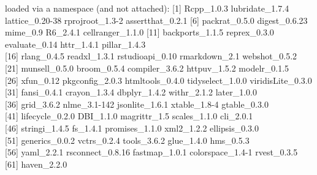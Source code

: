 \documentclass[]{article}
\begin{document}
loaded via a namespace (and not attached): {[}1{]} Rcpp\_1.0.3
lubridate\_1.7.4 lattice\_0.20-38 rprojroot\_1.3-2 assertthat\_0.2.1
{[}6{]} packrat\_0.5.0 digest\_0.6.23 mime\_0.9 R6\_2.4.1
cellranger\_1.1.0 {[}11{]} backports\_1.1.5 reprex\_0.3.0 evaluate\_0.14
httr\_1.4.1 pillar\_1.4.3\\
{[}16{]} rlang\_0.4.5 readxl\_1.3.1 rstudioapi\_0.10 rmarkdown\_2.1
webshot\_0.5.2\\
{[}21{]} munsell\_0.5.0 broom\_0.5.4 compiler\_3.6.2 httpuv\_1.5.2
modelr\_0.1.5\\
{[}26{]} xfun\_0.12 pkgconfig\_2.0.3 htmltools\_0.4.0 tidyselect\_1.0.0
viridisLite\_0.3.0 {[}31{]} fansi\_0.4.1 crayon\_1.3.4 dbplyr\_1.4.2
withr\_2.1.2 later\_1.0.0\\
{[}36{]} grid\_3.6.2 nlme\_3.1-142 jsonlite\_1.6.1 xtable\_1.8-4
gtable\_0.3.0\\
{[}41{]} lifecycle\_0.2.0 DBI\_1.1.0 magrittr\_1.5 scales\_1.1.0
cli\_2.0.1\\
{[}46{]} stringi\_1.4.5 fs\_1.4.1 promises\_1.1.0 xml2\_1.2.2
ellipsis\_0.3.0\\
{[}51{]} generics\_0.0.2 vctrs\_0.2.4 tools\_3.6.2 glue\_1.4.0
hms\_0.5.3\\
{[}56{]} yaml\_2.2.1 rsconnect\_0.8.16 fastmap\_1.0.1 colorspace\_1.4-1
rvest\_0.3.5\\
{[}61{]} haven\_2.2.0
\end{document}
